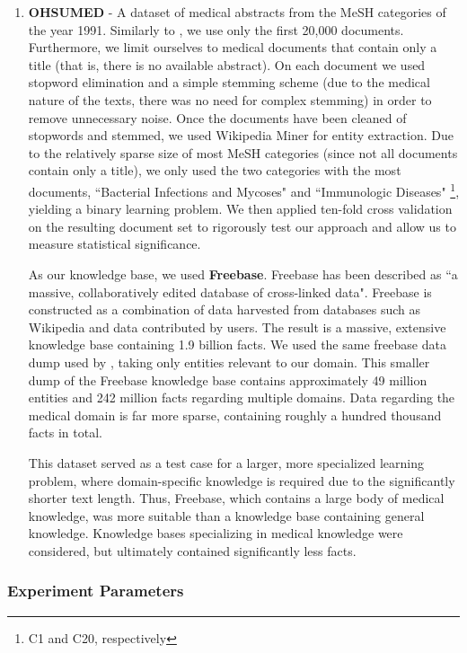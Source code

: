\documentclass[twoside,11pt]{article}
\theoremstyle{definition}
\begin{document}
\begin{enumerate}
	\item \textbf{OHSUMED}  - A dataset of medical abstracts from the MeSH categories of the year 1991. Similarly to  , we use only the first 20,000 documents. Furthermore, we limit ourselves to medical documents that contain only a title (that is, there is no available abstract). On each document we used stopword elimination and a simple stemming scheme (due to the medical nature of the texts, there was no need for complex stemming) in order to remove unnecessary noise. Once the documents have been cleaned of stopwords and stemmed, we used Wikipedia Miner \cite{milne2013open} for entity extraction. 
	Due to the relatively sparse size of most MeSH categories (since not all documents contain only a title), we only used the two categories with the most documents, ``Bacterial Infections and Mycoses" and ``Immunologic Diseases" \footnote{C1 and C20, respectively}, yielding a binary learning problem. We then applied ten-fold cross validation on the resulting document set to rigorously test our approach and allow us to measure statistical significance.
	
	As our knowledge base, we used \textbf{Freebase}.
	Freebase has been described as ``a massive, collaboratively edited database of cross-linked data". Freebase is constructed as a combination of data harvested from databases such as Wikipedia and data contributed by users. The result is a massive, extensive knowledge base containing 1.9 billion facts. 
	 We used the same freebase data dump used by , taking only entities relevant to our domain. This smaller dump of the Freebase knowledge base contains approximately 49 million entities and 242 million facts regarding multiple domains. Data regarding the medical domain is far more sparse, containing roughly a hundred thousand facts in total.
	
	This dataset served as a test case for a larger, more specialized learning problem, where domain-specific knowledge is required due to the significantly shorter text length. Thus, Freebase, which contains a large body of medical knowledge, was more suitable than a knowledge base containing general knowledge. Knowledge bases specializing in medical knowledge were considered, but ultimately contained significantly less facts.
\end{enumerate}

\subsubsection{Experiment Parameters}
\end{document}
